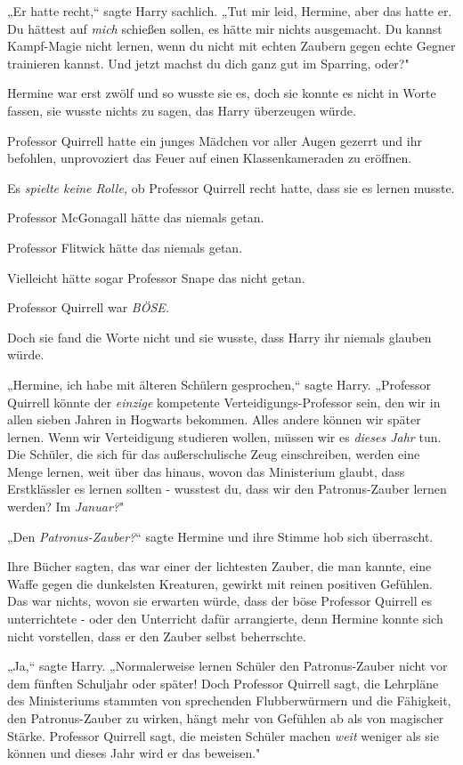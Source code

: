 {„Er hatte recht,“ sagte Harry sachlich. „Tut mir leid, Hermine, aber das hatte er. Du hättest auf \emph{mich} schießen sollen, es hätte mir nichts ausgemacht. Du kannst Kampf-Magie nicht lernen, wenn du nicht mit echten Zaubern gegen echte Gegner trainieren kannst. Und jetzt machst du dich ganz gut im Sparring, oder?"

Hermine war erst zwölf und so wusste sie es, doch sie konnte es nicht in Worte fassen, sie wusste nichts zu sagen, das Harry überzeugen würde.

Professor Quirrell hatte ein junges Mädchen vor aller Augen gezerrt und ihr befohlen, unprovoziert das Feuer auf einen Klassenkameraden zu eröffnen.

Es \emph{spielte keine Rolle,} ob Professor Quirrell recht hatte, dass sie es lernen musste.

Professor McGonagall hätte das niemals getan.

Professor Flitwick hätte das niemals getan.

Vielleicht hätte sogar Professor Snape das nicht getan.

Professor Quirrell war \emph{BÖSE.}

Doch sie fand die Worte nicht und sie wusste, dass Harry ihr niemals glauben würde.

„Hermine, ich habe mit älteren Schülern gesprochen,“ sagte Harry. „Professor Quirrell könnte der \emph{einzige} kompetente Verteidigungs-Professor sein, den wir in allen sieben Jahren in Hogwarts bekommen. Alles andere können wir später lernen. Wenn wir Verteidigung studieren wollen, müssen wir es \emph{dieses Jahr} tun. Die Schüler, die sich für das außerschulische Zeug einschreiben, werden eine Menge lernen, weit über das hinaus, wovon das Ministerium glaubt, dass Erstklässler es lernen sollten - wusstest du, dass wir den Patronus-Zauber lernen werden? Im \emph{Januar?}"

„Den \emph{Patronus-Zauber?}“ sagte Hermine und ihre Stimme hob sich überrascht.

Ihre Bücher sagten, das war einer der lichtesten Zauber, die man kannte, eine Waffe gegen die dunkelsten Kreaturen, gewirkt mit reinen positiven Gefühlen. Das war nichts, wovon sie erwarten würde, dass der böse Professor Quirrell es unterrichtete - oder den Unterricht dafür arrangierte, denn Hermine konnte sich nicht vorstellen, dass er den Zauber selbst beherrschte.

„Ja,“ sagte Harry. „Normalerweise lernen Schüler den Patronus-Zauber nicht vor dem fünften Schuljahr oder später! Doch Professor Quirrell sagt, die Lehrpläne des Ministeriums stammten von sprechenden Flubberwürmern und die Fähigkeit, den Patronus-Zauber zu wirken, hängt mehr von Gefühlen ab als von magischer Stärke. Professor Quirrell sagt, die meisten Schüler machen \emph{weit} weniger als sie können und dieses Jahr wird er das beweisen."

}

